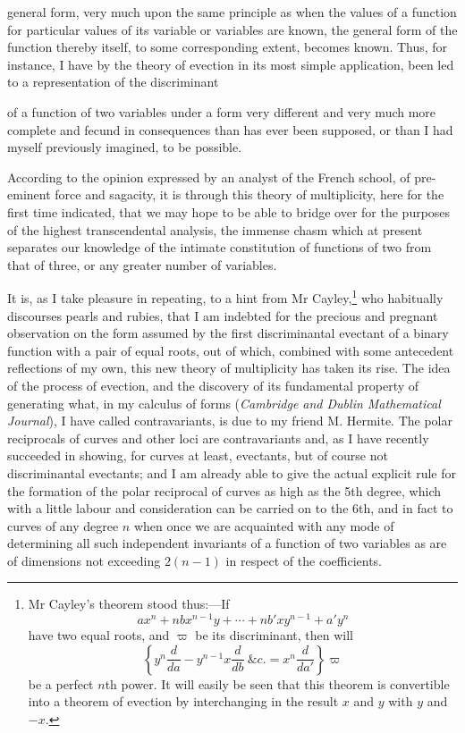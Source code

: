 \documentclass[11pt]{article}
\newcommand{\sourcepage}[1]{\marginpar{\scriptsize p.~#1}}
\begin{document}
general form, very much upon the same principle as when the values of a function for particular values of its variable or variables are known, the general form of the function thereby itself, to some corresponding extent, becomes known. Thus, for instance, I have by the theory of evection in its most simple application, been led to a representation of the discriminant

\sourcepage{376}
of a function of two variables under a form very different and very much more complete and fecund in consequences than has ever been supposed, or than I had myself previously imagined, to be possible.

According to the opinion expressed by an analyst of the French school, of pre-eminent force and sagacity, it is through this theory of multiplicity, here for the first time indicated, that we may hope to be able to bridge over for the purposes of the highest transcendental analysis, the immense chasm which at present separates our knowledge of the intimate constitution of functions of two from that of three, or any greater number of variables.

It is, as I take pleasure in repeating, to a hint from Mr Cayley,\footnote{Mr Cayley's theorem stood thus:---If
\[
ax^n+nbx^{n-1}y+\cdots+nb'xy^{n-1}+a'y^n
\]
have two equal roots, and $\varpi$ be its discriminant, then will
\[
\left\{y^n\frac{d}{da}-y^{n-1}x\frac{d}{db}\ \&c.=x^n\frac{d}{da'}\right\}\varpi
\]
be a perfect $n$th power. It will easily be seen that this theorem is convertible into a theorem of evection by interchanging in the result $x$ and $y$ with $y$ and $-x$.} who habitually discourses pearls and rubies, that I am indebted for the precious and pregnant observation on the form assumed by the first discriminantal evectant of a binary function with a pair of equal roots, out of which, combined with some antecedent reflections of my own, this new theory of multiplicity has taken its rise. The idea of the process of evection, and the discovery of its fundamental property of generating what, in my calculus of forms (\emph{Cambridge and Dublin Mathematical Journal}), I have called contravariants, is due to my friend M. Hermite. The polar reciprocals of curves and other loci are contravariants and, as I have recently succeeded in showing, for curves at least, evectants, but of course not discriminantal evectants; and I am already able to give the actual explicit rule for the formation of the polar reciprocal of curves as high as the 5th degree, which with a little labour and consideration can be carried on to the 6th, and in fact to curves of any degree $n$ when once we are acquainted with any mode of determining all such independent invariants of a function of two variables as are of dimensions not exceeding $2(n-1)$ in respect of the coefficients.
\end{document}
